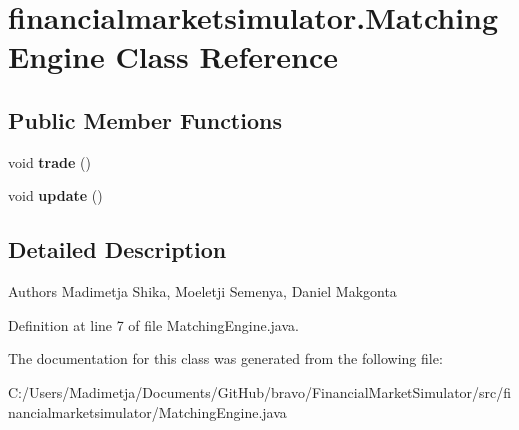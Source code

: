 \hypertarget{classfinancialmarketsimulator_1_1_matching_engine}{\section{financialmarketsimulator.\+Matching\+Engine Class Reference}
\label{classfinancialmarketsimulator_1_1_matching_engine}
}
\subsection*{Public Member Functions}
\begin{DoxyCompactItemize}
\item 
\hypertarget{classfinancialmarketsimulator_1_1_matching_engine_aa835268cf4fa1feff9f528b72cadd57f}{void {\bfseries trade} ()}\label{classfinancialmarketsimulator_1_1_matching_engine_aa835268cf4fa1feff9f528b72cadd57f}

\item 
\hypertarget{classfinancialmarketsimulator_1_1_matching_engine_a7a5e112f743728b6ea9d62d263fb74e3}{void {\bfseries update} ()}\label{classfinancialmarketsimulator_1_1_matching_engine_a7a5e112f743728b6ea9d62d263fb74e3}

\end{DoxyCompactItemize}


\subsection{Detailed Description}
\begin{DoxyAuthor}{Authors}
Madimetja Shika, Moeletji Semenya, Daniel Makgonta 
\end{DoxyAuthor}


Definition at line 7 of file Matching\+Engine.\+java.



The documentation for this class was generated from the following file\+:\begin{DoxyCompactItemize}
\item 
C\+:/\+Users/\+Madimetja/\+Documents/\+Git\+Hub/bravo/\+Financial\+Market\+Simulator/src/financialmarketsimulator/Matching\+Engine.\+java\end{DoxyCompactItemize}
